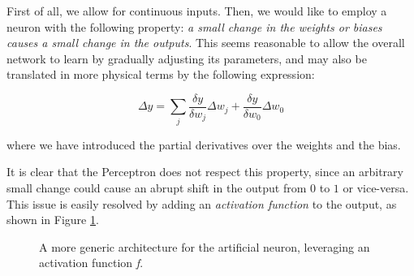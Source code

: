 First of all, we allow for continuous inputs. Then, we would like to employ a neuron with the following property: \emph{a small change in the \emph{weights} or \emph{biases} causes a small change in the \emph{outputs}}. This seems reasonable to allow the overall network to learn by gradually adjusting its parameters, and may also be translated in more physical terms by the following expression:

\begin{equation}\label{eqn:yderiv}
  \Delta y = \sum_j \frac{\delta y}{\delta w_j}\Delta w_j + \frac{\delta y}{\delta w_0}\Delta w_0
\end{equation}



where we have introduced the partial derivatives over the weights and the bias.

It is clear that the Perceptron does not respect this property, since an arbitrary small change could cause an abrupt shift in the output from $0$ to $1$ or vice-versa. This issue is easily resolved by adding an \emph{activation function} to the output, as shown in Figure \ref{fig:artneur}.

\begin{figure}
    \centering
    
    
    \caption[Generic artificial neuron]{A more generic architecture for the artificial neuron, leveraging an activation function \emph{f}.}
    \label{fig:artneur}
\end{figure}

